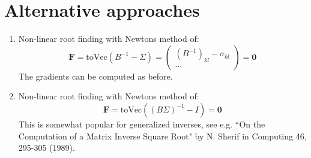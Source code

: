 \documentclass[11pt]{article}
\begin{document}

\section{Alternative approaches}


\begin{enumerate}

\item Non-linear root finding with Newtons method of:
\begin{equation}
\boldsymbol{F} 
= \text{toVec}(B^{-1} - \Sigma)
= \begin{pmatrix}
	(B^{-1})_{kl} - \sigma_{kl} \\
	\dots
\end{pmatrix}
= \boldsymbol{0}
\end{equation}
The gradients can be computed as before.

\item Non-linear root finding with Newtons method of:
\begin{equation}
\boldsymbol{F} 
= \text{toVec}((B \Sigma)^{-1} - I)
= \boldsymbol{0}
\end{equation}
This is somewhat popular for generalized inverses, see e.g. ``On the Computation of a Matrix Inverse Square Root" by N. Sherif in Computing 46, 295-305 (1989).

\end{enumerate}
\end{document}
